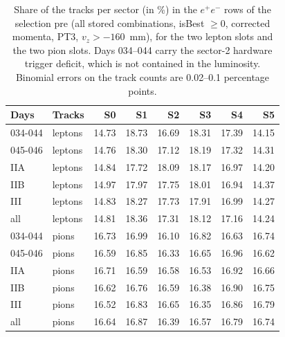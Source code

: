 \begin{table}[H]
\centering\small
\setlength{\tabcolsep}{4pt}
\caption{Share of the tracks per sector (in \%) in the $e^+e^-$ rows of the selection pre (all stored combinations, isBest $\geq 0$, corrected momenta, PT3, $v_z>-160$~mm), for the two lepton slots and the two pion slots. Days 034--044 carry the sector-2 hardware trigger deficit, which is not contained in the luminosity. Binomial errors on the track counts are 0.02--0.1 percentage points.}
\label{tab:smp_sectors}
\begin{tabular}{llrrrrrr}
\toprule
Days & Tracks & S0 & S1 & S2 & S3 & S4 & S5 \\
\midrule
034-044 & leptons & 14.73 & 18.73 & 16.69 & 18.31 & 17.39 & 14.15 \\
045-046 & leptons & 14.76 & 18.30 & 17.12 & 18.19 & 17.32 & 14.31 \\
IIA & leptons & 14.84 & 17.72 & 18.09 & 18.17 & 16.97 & 14.20 \\
IIB & leptons & 14.97 & 17.97 & 17.75 & 18.01 & 16.94 & 14.37 \\
III & leptons & 14.83 & 18.27 & 17.73 & 17.91 & 16.99 & 14.27 \\
all & leptons & 14.81 & 18.36 & 17.31 & 18.12 & 17.16 & 14.24 \\
\midrule
034-044 & pions & 16.73 & 16.99 & 16.10 & 16.82 & 16.63 & 16.74 \\
045-046 & pions & 16.59 & 16.85 & 16.33 & 16.65 & 16.96 & 16.62 \\
IIA & pions & 16.71 & 16.59 & 16.58 & 16.53 & 16.92 & 16.66 \\
IIB & pions & 16.62 & 16.76 & 16.59 & 16.38 & 16.90 & 16.75 \\
III & pions & 16.52 & 16.83 & 16.65 & 16.35 & 16.86 & 16.79 \\
all & pions & 16.64 & 16.87 & 16.39 & 16.57 & 16.79 & 16.74 \\
\bottomrule
\end{tabular}
\end{table}
